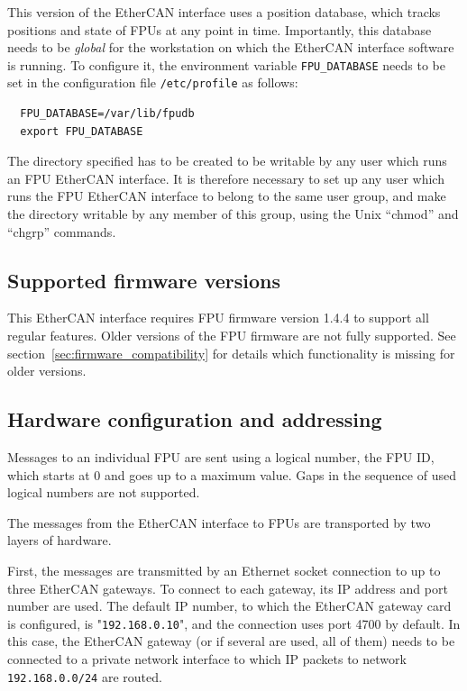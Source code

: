 \documentclass[11pt,a4paper]{scrartcl}
\begin{document}
This version of the EtherCAN interface uses a position database, which tracks
positions and state of FPUs at any point in time. Importantly, this
database needs to be \emph{global} for the workstation on which the
EtherCAN interface software is running. To configure it, the environment variable
\texttt{FPU\_DATABASE} needs to be set in the configuration file
\texttt{/etc/profile} as follows:

%
\begin{verbatim}
  FPU_DATABASE=/var/lib/fpudb
  export FPU_DATABASE
\end{verbatim}

The directory specified has to be created to be writable by any user
which runs an FPU EtherCAN interface. It is therefore necessary to set up any user
which runs the FPU EtherCAN interface to belong to the same user group, and make
the directory writable by any member of this group, using the Unix
``chmod'' and ``chgrp'' commands.

\subsection{Supported firmware versions}
This EtherCAN interface requires FPU firmware version 1.4.4 to support all regular
features. Older versions of the FPU firmware are not fully supported.
See section~\ref{sec:firmware_compatibility} for details which
functionality is missing for older versions.

\subsection{Hardware configuration and addressing}
Messages to an individual FPU are sent using a logical number, the FPU
ID, which starts at 0 and goes up to a maximum value. Gaps in the
sequence of used logical numbers are not supported.

The messages from the EtherCAN interface to FPUs are transported by two layers of
hardware.

   First, the
messages are transmitted by an Ethernet socket connection to up to
three EtherCAN gateways. To connect to each gateway, its IP address
and port number are used. The default IP number, to which the EtherCAN
gateway card is configured, is "\texttt{192.168.0.10}", and the
connection uses port 4700 by default. In this case, the EtherCAN
gateway (or if several are used, all of them) needs to be connected to
a private network interface to which IP packets to network
\texttt{192.168.0.0/24} are routed.
\end{document}
